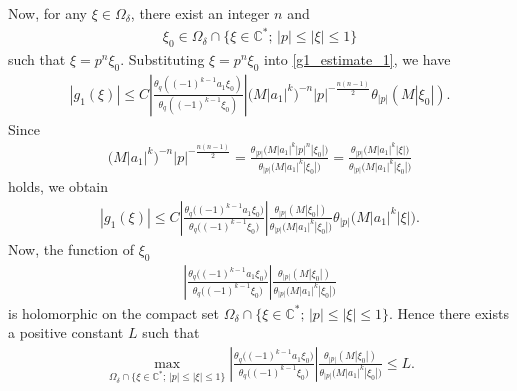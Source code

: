 \documentclass[pdftex]{sigma}
\numberwithin{equation}{section}
\begin{document}
Now, for any $\xi \in\Omega_\delta$, there exist an integer $n$ and
\begin{gather*}
\xi_0\in\Omega_\delta \cap\{\xi\in\mathbb{C}^* ;\,|p|\le|\xi|\le1\}
\end{gather*}
such that $\xi=p^n\xi_0$.
Substituting $\xi=p^n\xi_0$ into \eqref{g1_estimate_1}, we have
\begin{gather*}
|g_1(\xi)|\le C\left|\frac{\theta_q((-1)^{k-1}a_1\xi_0)}{\theta_q((-1)^{k-1}\xi_0)}\right|\big(M|a_1|^k\big)^{-n}|p|^{-\frac{n(n-1)}{2}}\theta_{|p|}(M|\xi_0|).
\end{gather*}
Since
\begin{gather*}
\big(M|a_1|^k\big)^{-n}|p|^{-\frac{n(n-1)}{2}}=\frac{\theta_{|p|}\big(M|a_1|^k|p|^n|\xi_0|\big)}{\theta_{|p|}\big(M|a_1|^k|\xi_0|\big)}=\frac{\theta_{|p|}\big(M|a_1|^k|\xi|\big)}{\theta_{|p|}\big(M|a_1|^k|\xi_0|\big)}
\end{gather*}
holds, we obtain
\begin{gather*}
|g_1(\xi)|\le C\left|\frac{\theta_q\big((-1)^{k-1}a_1\xi_0\big)}{\theta_q\big((-1)^{k-1}\xi_0\big)}\right|\frac{\theta_{|p|}(M|\xi_0|)}{\theta_{|p|}\big(M|a_1|^k|\xi_0|\big)}\theta_{|p|}\big(M|a_1|^k|\xi|\big).
\end{gather*}
Now, the function of $\xi_0$
\begin{gather*}
\left|\frac{\theta_q\big((-1)^{k-1}a_1\xi_0\big)}{\theta_q\big((-1)^{k-1}\xi_0\big)}\right|\frac{\theta_{|p|}(M|\xi_0|)}{\theta_{|p|}\big(M|a_1|^k|\xi_0|\big)}
\end{gather*}
is holomorphic on the compact set $\Omega_\delta \cap\{\xi\in\mathbb{C}^* ;\,|p|\le|\xi|\le1\}$. Hence there exists a positive constant $L$ such that
\begin{gather*}
\max_{\Omega_\delta \cap\{\xi\in\mathbb{C}^* ;\,|p|\le|\xi|\le1\}}\left|\frac{\theta_q\big((-1)^{k-1}a_1\xi_0\big)}{\theta_q\big((-1)^{k-1}\xi_0\big)}\right|\frac{\theta_{|p|}(M|\xi_0|)}{\theta_{|p|}\big(M|a_1|^k|\xi_0|\big)}\le L.
\end{gather*}
\end{document}
